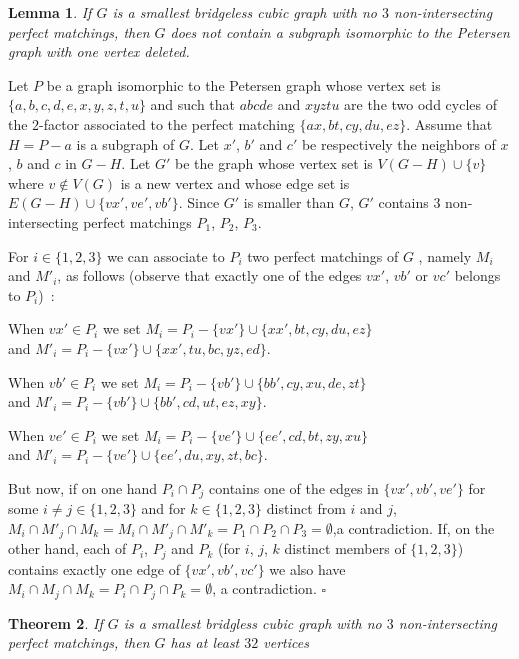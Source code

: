 \documentclass{elsart}
\theoremstyle{plain} \theoremheaderfont{\scshape}
\newtheorem{Thm}{\bf Theorem}
\newtheorem{Lem}[Thm]{\bf Lemma}
\newenvironment{Prf}{{\bf \noindent Proof } }{\hfill$\square$\\}
\begin{document}
\begin{Lem}\label{Lemma:P-vExcluded}  If $G$ is a smallest bridgeless
cubic graph with no $3$ non-intersecting perfect matchings, then $G$
does not contain a subgraph isomorphic to the Petersen graph with
one vertex deleted.
\end{Lem}
\begin{Prf}
Let $P$ be a graph isomorphic to the Petersen graph whose vertex set
is $\{a,b,c,d,e,x,y,z,t,u\}$ and such that $abcde$ and $xyztu$ are
the two odd cycles of the $2$-factor associated to the perfect
matching $\{ax, bt, cy, du, ez\}$. Assume that $H=P-a$ is a subgraph
of $G$. Let $x'$, $b'$ and $c'$ be respectively the neighbors of
$x$, $b$ and $c$ in $G-H$. Let $G'$ be the graph whose vertex set is
$V(G-H)\cup\{v\}$ where $v\notin V(G)$ is a new vertex and whose
edge set is $E(G-H)\cup\{vx', ve', vb'\}$. Since $G'$ is smaller
than $G$, $G'$ contains $3$ non-intersecting perfect matchings
$P_1$, $P_2$, $P_3$.

For $i\in\{1,2,3\}$ we can associate to $P_i$ two perfect matchings
of $G$ , namely $M_i$ and $M'_i$, as follows (observe that exactly
one of the edges $vx'$, $vb'$ or $vc'$ belongs to $P_i$)~:
\begin{description}
\item When $vx'\in P_i$ we set $M_i=P_i-\{vx'\}\cup\{xx', bt, cy, du, ez\}$ \\and $M'_i=P_i-\{vx'\}\cup\{xx', tu, bc, yz, ed\}$.
\item When $vb'\in P_i$ we set $M_i=P_i-\{vb'\}\cup\{bb', cy, xu, de, zt\}$ \\ and $M'_i=P_i-\{vb'\}\cup\{bb', cd, ut, ez, xy\}$.
\item When $ve'\in P_i$ we set $M_i=P_i-\{ve'\}\cup\{ee', cd, bt, zy, xu\}$ \\ and $M'_i=P_i-\{ve'\}\cup\{ee', du, xy, zt, bc\}$.
\end{description}
But now, if on one hand $P_i\cap P_j$ contains one of the edges in
$\{vx', vb', ve'\}$  for some $i\neq j\in\{1,2,3\}$ and  for $k\in
\{1,2,3\}$ distinct from $i$ and $j$, $M_i\cap M'_j\cap M_k=M_i\cap
M'_j\cap M'_k=P_1\cap P_2\cap P_3=\emptyset$,a contradiction. If, on
the other hand, each of $P_i$, $P_j$ and $P_k$ (for $i$, $j$, $k$
distinct members of $\{1,2,3\}$) contains exactly one edge of
$\{vx',vb',vc'\}$ we also have $M_i\cap M_j\cap M_k=P_i\cap P_j\cap
P_k=\emptyset$, a contradiction.
\end{Prf}
\begin{Thm} \label{Theorem:MinimumCounterExample32}
If $G$ is a smallest bridgless cubic graph with no $3$
non-intersecting perfect matchings, then $G$ has at least $32$
vertices
\end{Thm}
\end{document}
